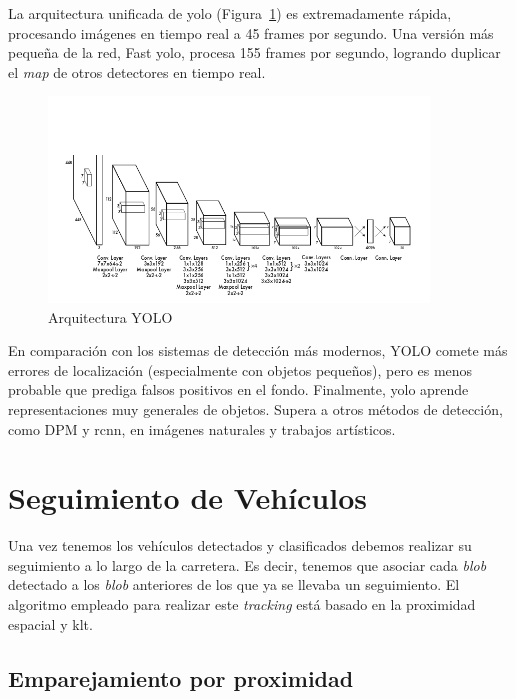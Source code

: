 La arquitectura unificada de \acrshort{yolo} (Figura~\ref{fig.yolov3}) es extremadamente rápida, procesando imágenes en tiempo real a 45 frames por segundo. Una versión más pequeña de la red, Fast \acrshort{yolo}, procesa 155 frames por segundo, logrando duplicar el \textit{\acrfull{map}} de otros detectores en tiempo real.

\begin{figure}[H] 
\begin{center}
	\includegraphics[width=0.9\textwidth]{figures/Diseno_global/yolov3.png}
   \caption{Arquitectura YOLO}
	\label{fig.yolov3}
\end{center}
\end{figure}

En comparación con los sistemas de detección más modernos, YOLO comete más errores de localización (especialmente con objetos pequeños), pero es menos probable que prediga falsos positivos en el fondo. Finalmente, \acrshort{yolo} aprende representaciones muy generales de objetos. Supera a otros métodos de detección, como DPM y \acrshort{rcnn}, en imágenes naturales y trabajos artísticos.


\section{Seguimiento de Vehículos}\label{sec.seguimiento}

Una vez tenemos los vehículos detectados y clasificados debemos realizar su seguimiento a lo largo de la carretera. Es decir, tenemos que asociar cada \textit{blob} detectado a los \textit{blob} anteriores de los que ya se llevaba un seguimiento. El algoritmo empleado para realizar este \textit{tracking} está basado en la proximidad espacial y \acrshort{klt}. 

\subsection{Emparejamiento por proximidad}

